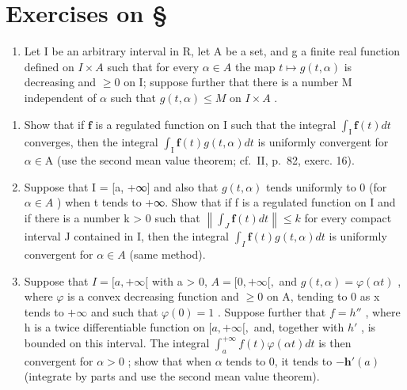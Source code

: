 \section*{Exercises on \S{}}
{}

\begin{enumerate}
\def\labelenumi{\arabic{enumi})}
\tightlist
\item
  Let I be an arbitrary interval in R, let A be a set, and g a finite real function defined on \(I \times A\) such that for every \(\alpha \in A\) the map \(t \mapsto g(t, \alpha)\) is decreasing and \(\geqslant 0\) on I; suppose further that there is a number M independent of \(\alpha\) such that \(g(t, \alpha) \leqslant M\) on \(I \times A\) .
\end{enumerate}

\begin{enumerate}
\def\labelenumi{\alph{enumi})}
\item
  Show that if \(\mathbf{f}\) is a regulated function on I such that the integral \(\int_{\mathrm{I}} \mathbf{f}(t) dt\) converges, then the integral \(\int_{\mathrm{I}} \mathbf{f}(t) g(t, \alpha) dt\) is uniformly convergent for \(\alpha \in \mathrm{A}\) (use the second mean value theorem; cf.~II, p.~82, exerc. 16).
\item
  Suppose that I = {[}a, +∞{]} and also that \(g(t, \alpha)\) tends uniformly to 0 (for \(\alpha \in A\) ) when t tends to +∞. Show that if f is a regulated function on I and if there is a number k \textgreater{} 0 such that \(\left\|\int_{J} \mathbf{f}(t) dt\right\| \leqslant k\) for every compact interval J contained in I, then the integral \(\int_{I} \mathbf{f}(t) g(t, \alpha) dt\) is uniformly convergent for \(\alpha \in A\) (same method).
\item
  Suppose that \(I = [a, +\infty[\) with a \textgreater{} 0, \(A = [0, +\infty[,\) and \(g(t, \alpha) = \varphi(\alpha t)\) , where \(\varphi\) is a convex decreasing function and \(\geqslant 0\) on A, tending to 0 as x tends to \(+\infty\) and such that \(\varphi(0) = 1\) . Suppose further that \(f = h''\) , where h is a twice differentiable function on \([a, +\infty[,\) and, together with \(h'\) , is bounded on this interval. The integral \(\int_{a}^{+\infty} f(t) \varphi(\alpha t) dt\) is then convergent for \(\alpha > 0\) ; show that when \(\alpha\) tends to 0, it tends to \(-\mathbf{h}'(a)\) (integrate by parts and use the second mean value theorem).
\end{enumerate}

